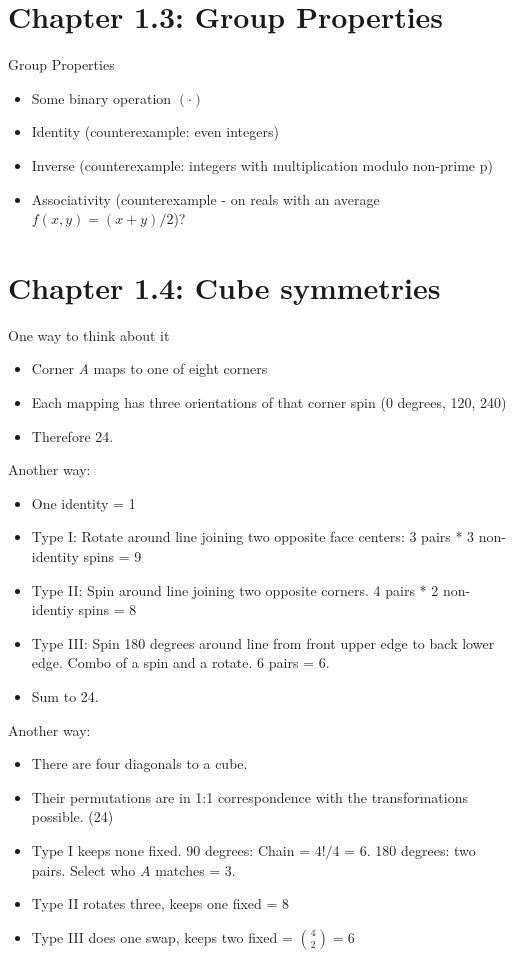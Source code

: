 \documentclass[11pt, oneside]{article}   	%
\begin{document}
\section {Chapter 1.3: Group Properties}

Group Properties

\begin{itemize}
\item Some binary operation $( \cdot )$
\item Identity (counterexample: even integers)
\item Inverse (counterexample: integers with multiplication modulo non-prime p)
\item Associativity (counterexample - on reals with an average $f(x,y) = (x+y)/2$)?
\end{itemize}

\section {Chapter 1.4: Cube symmetries}

One way  to think about it

\begin{itemize}
\item Corner \emph{A} maps to one of eight corners
\item Each mapping has three orientations of that corner spin  (0 degrees, 120, 240)
\item Therefore 24.
\end{itemize}

Another way:
\begin{itemize}
\item One identity = 1
\item Type I: Rotate around line joining two opposite face centers: 3 pairs * 3 non-identity spins = 9
\item Type II: Spin around line joining two opposite corners.  4 pairs * 2 non-identiy spins = 8
\item Type III: Spin 180 degrees around line from front upper edge to back lower edge.  Combo of a spin and a rotate.  6 pairs = 6.
\item Sum to 24.
\end{itemize}

Another way:
\begin{itemize}
\item There are four diagonals to a cube.
\item Their permutations are in 1:1 correspondence with the transformations possible.   (24)
\item Type I keeps none fixed.  90 degrees: Chain = $4! / 4$ = 6.   180 degrees: two pairs.  Select who $A$ matches = 3.
\item Type II rotates three, keeps one fixed = 8
\item Type III does one swap, keeps two fixed = ${4 \choose 2} = 6$
\end{itemize}
\end{document}
